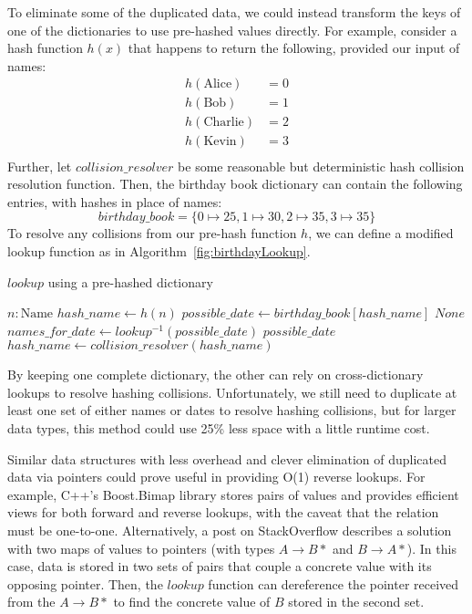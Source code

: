 \documentclass{article}
\begin{document}
To eliminate some of the duplicated data, we could instead transform the keys of one of the dictionaries to use pre-hashed values directly. For example, consider a hash function $h(x)$ that happens to return the following, provided our input of names:
\begin{align*}
h(\text{Alice}) &= 0\\
h(\text{Bob}) &= 1\\
h(\text{Charlie}) &= 2\\
h(\text{Kevin}) &= 3\\
\end{align*}
Further, let $collision\_resolver$ be some reasonable but deterministic hash collision resolution function. Then, the birthday book dictionary can contain the following entries, with hashes in place of names:
\[birthday\_book = \{0 \mapsto 25, 1 \mapsto 30, 2 \mapsto 35, 3 \mapsto 35 \}\]
To resolve any collisions from our pre-hash function $h$, we can define a modified lookup function as in Algorithm~\ref{fig:birthdayLookup}.

\begin{algorithm}
  \caption{$lookup$ using a pre-hashed dictionary}
  \begin{algorithmic}
    \Require $n: \text{Name}$
    \State $hash\_name \gets h(n)$
      \State $possible\_date \gets birthday\_book[hash\_name]$
        \Return $None$
      \EndIf
      \State $names\_for\_date \gets lookup^{-1}(possible\_date)$
        \Return $possible\_date$
      \EndIf
      \State $hash\_name \gets collision\_resolver(hash\_name)$
    \EndWhile
  \end{algorithmic}
  \label{fig:birthdayLookup}
\end{algorithm}

By keeping one complete dictionary, the other can rely on cross-dictionary lookups to resolve hashing collisions. Unfortunately, we still need to duplicate at least one set of either names or dates to resolve hashing collisions, but for larger data types, this method could use 25\% less space with a little runtime cost.

Similar data structures with less overhead and clever elimination of duplicated data via pointers could prove useful in providing O(1) reverse lookups. For example, C++'s Boost.Bimap library \cite{boostBimap1, boostBimap2} stores pairs of values and provides efficient views for both forward and reverse lookups, with the caveat that the relation must be one-to-one. Alternatively, a post on StackOverflow \cite{bimapStackOverflow} describes a solution with two maps of values to pointers (with types $A \rightarrow B*$ and $B \rightarrow A*$). In this case, data is stored in two sets of pairs that couple a concrete value with its opposing pointer. Then, the $lookup$ function can dereference the pointer received from the $A \rightarrow B*$ to find the concrete value of $B$ stored in the second set.
\end{document}

